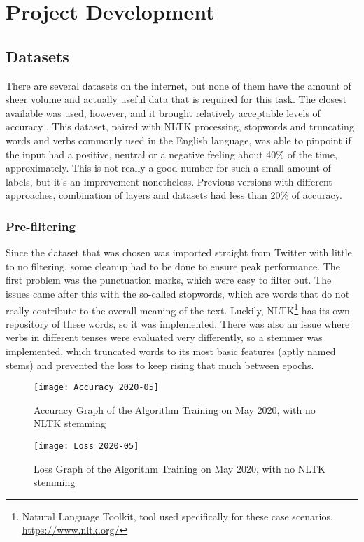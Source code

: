 \chapter{Project Development}

\section{Datasets}
There are several datasets on the internet, but none of them have the amount of sheer volume and actually useful data that is required for this task. The closest available was used, however, and it brought relatively acceptable levels of accuracy \citep{rf7}.
This dataset, paired with NLTK processing, stopwords and truncating words and verbs commonly used in the English language, was able to pinpoint if the input had a positive, neutral or a negative feeling about 40\% of the time, approximately.
This is not really a good number for such a small amount of labels, but it's an improvement nonetheless. Previous versions with different approaches, combination of layers and datasets had less than 20\% of accuracy.
\pagebreak

\subsection{Pre-filtering}
Since the dataset that was chosen was imported straight from Twitter with little to no filtering, some cleanup had to be done to ensure peak performance.
The first problem was the punctuation marks, which were easy to filter out. The issues came after this with the so-called stopwords, which are words that do not really contribute to the overall meaning of the text. Luckily, NLTK\footnote{Natural Language Toolkit, tool used specifically for these case scenarios. \url{https://www.nltk.org/}} has its own repository of these words, so it was implemented. There was also an issue where verbs in different tenses were evaluated very differently, so a  stemmer was implemented, which truncated words to its most basic features (aptly named stems) and prevented the loss to keep rising that much between epochs.
\pagebreak
\begin{figure}[!h]
	\centering
	\texttt{[image: Accuracy 2020-05]}
	\caption{Accuracy Graph of the Algorithm Training on May 2020, with no NLTK stemming}
	\label{fig:accuracy2020_nofilter}
	\texttt{[image: Loss 2020-05]}
	\caption{Loss Graph of the Algorithm Training on May 2020, with no NLTK stemming}
	\label{fig:loss2020_nofilter}
\end{figure}


